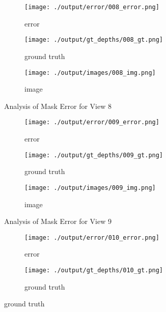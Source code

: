 \documentclass{article}
\begin{document}
\begin{figure}
\end{figure}\begin{figure}
	\centering
	\begin{subfigure}{0.3\textwidth}
		\centering
		\texttt{[image: ./output/error/008\_error.png]}
		\caption{error}
		\label{fig:error8}
	\end{subfigure}
	\hfill
	\centering
	\begin{subfigure}{0.3\textwidth}
		\centering
		\texttt{[image: ./output/gt\_depths/008\_gt.png]}
		\caption{ground truth}
		\label{fig:gt8}
	\end{subfigure}
	\hfill
	\centering
	\begin{subfigure}{0.3\textwidth}
		\centering
		\texttt{[image: ./output/images/008\_img.png]}
		\caption{image}
		\label{fig:img8}
	\end{subfigure}
	\hfill
	\caption{Analysis of Mask Error for View 8}
	\label{fig:error_analys8}
\end{figure}\begin{figure}
	\centering
	\begin{subfigure}{0.3\textwidth}
		\centering
		\texttt{[image: ./output/error/009\_error.png]}
		\caption{error}
		\label{fig:error9}
	\end{subfigure}
	\hfill
	\centering
	\begin{subfigure}{0.3\textwidth}
		\centering
		\texttt{[image: ./output/gt\_depths/009\_gt.png]}
		\caption{ground truth}
		\label{fig:gt9}
	\end{subfigure}
	\hfill
	\centering
	\begin{subfigure}{0.3\textwidth}
		\centering
		\texttt{[image: ./output/images/009\_img.png]}
		\caption{image}
		\label{fig:img9}
	\end{subfigure}
	\hfill
	\caption{Analysis of Mask Error for View 9}
	\label{fig:error_analys9}
\end{figure}\begin{figure}
	\centering
	\begin{subfigure}{0.3\textwidth}
		\centering
		\texttt{[image: ./output/error/010\_error.png]}
		\caption{error}
		\label{fig:error10}
	\end{subfigure}
	\hfill
	\centering
	\begin{subfigure}{0.3\textwidth}
		\centering
		\texttt{[image: ./output/gt\_depths/010\_gt.png]}
		\caption{ground truth}
		\label{fig:gt10}
	\end{subfigure}

\end{figure}
\end{document}
